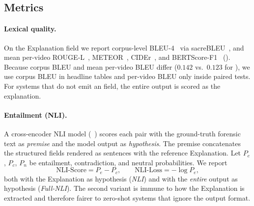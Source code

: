 \subsection{Metrics}
\label{sec:metrics}

\paragraph{Lexical quality.}
On the Explanation field we report corpus-level BLEU-4~\cite{papineni2002bleu} via sacreBLEU~\cite{post2018sacrebleu}, and mean per-video ROUGE-L~\cite{lin2004rouge}, METEOR~\cite{banerjee2005meteor}, CIDEr~\cite{vedantam2015cider}, and BERTScore-F1~\cite{zhang2020bertscore} ().
Because corpus BLEU and mean per-video BLEU differ ($0.142$ vs.\ $0.123$ for \crashlogic), we use corpus BLEU in headline tables and per-video BLEU only inside paired tests.
For systems that do not emit an  field, the entire output is scored as the explanation.

\paragraph{Entailment (NLI).}
A cross-encoder NLI model (~\cite{he2023debertav3}) scores each pair with the ground-truth forensic text as \emph{premise} and the model output as \emph{hypothesis}.
The premise concatenates the structured fields rendered as sentences with the reference Explanation.
Let $P_e$, $P_c$, $P_n$ be entailment, contradiction, and neutral probabilities.
We report
\begin{equation}
\mathrm{NLI\text{-}Score}=P_e-P_c,\qquad \mathrm{NLI\text{-}Loss}=-\log P_e ,
\label{eq:nli}
\end{equation}
both with the Explanation as hypothesis (\emph{NLI}) and with the \emph{entire} output as hypothesis (\emph{Full-NLI}).
The second variant is immune to how the Explanation is extracted and therefore fairer to zero-shot systems that ignore the output format.

